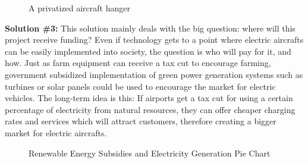 \documentclass[../main.tex]{subfiles}
\begin{document}
\begin{figure}[h!]
    \centering
    \caption{A privatized aircraft hanger}
    \centering
\end{figure}

\newpage
\noindent\textbf{Solution \#3:}\newline
\indent This solution mainly deals with the big question: where will this project receive funding? Even if technology gets to a point where electric aircrafts can be easily implemented into society, the question is who will pay for it, and how. Just as farm equipment can receive a tax cut to encourage farming, government subsidized implementation of green power generation systems such as turbines or solar panels could be used to encourage the market for electric vehicles. The long-term idea is this: If airports get a tax cut for using a certain percentage of electricity from natural resources, they can offer cheaper charging rates and services which will attract customers, therefore creating a bigger market for electric aircrafts.  \par
\begin{figure}[h!]
    \centering
    \caption{Renewable Energy Subsidies and Electricity Generation Pie Chart}
    \centering
\end{figure}
\end{document}
